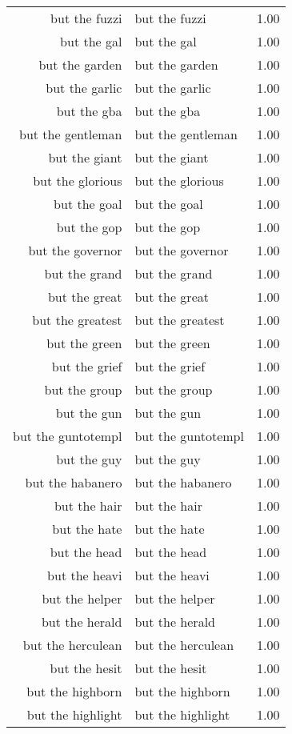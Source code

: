 \begin{table}[ht]
\begin{tabular}{rlr}
  but the fuzzi & but the fuzzi & 1.00 \\ 
  but the gal & but the gal & 1.00 \\ 
  but the garden & but the garden & 1.00 \\ 
  but the garlic & but the garlic & 1.00 \\ 
  but the gba & but the gba & 1.00 \\ 
  but the gentleman & but the gentleman & 1.00 \\ 
  but the giant & but the giant & 1.00 \\ 
  but the glorious & but the glorious & 1.00 \\ 
  but the goal & but the goal & 1.00 \\ 
  but the gop & but the gop & 1.00 \\ 
  but the governor & but the governor & 1.00 \\ 
  but the grand & but the grand & 1.00 \\ 
  but the great & but the great & 1.00 \\ 
  but the greatest & but the greatest & 1.00 \\ 
  but the green & but the green & 1.00 \\ 
  but the grief & but the grief & 1.00 \\ 
  but the group & but the group & 1.00 \\ 
  but the gun & but the gun & 1.00 \\ 
  but the guntotempl & but the guntotempl & 1.00 \\ 
  but the guy & but the guy & 1.00 \\ 
  but the habanero & but the habanero & 1.00 \\ 
  but the hair & but the hair & 1.00 \\ 
  but the hate & but the hate & 1.00 \\ 
  but the head & but the head & 1.00 \\ 
  but the heavi & but the heavi & 1.00 \\ 
  but the helper & but the helper & 1.00 \\ 
  but the herald & but the herald & 1.00 \\ 
  but the herculean & but the herculean & 1.00 \\ 
  but the hesit & but the hesit & 1.00 \\ 
  but the highborn & but the highborn & 1.00 \\ 
  but the highlight & but the highlight & 1.00 \\ 

\end{tabular}
\end{table}
